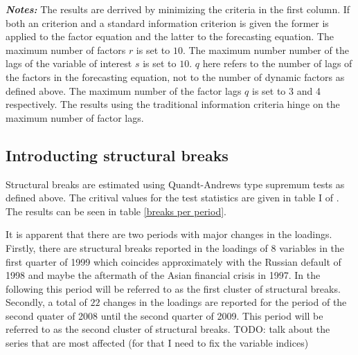 \documentclass[12pt]{article}
\begin{document}
\begin{table}[ht]
	\begin{minipage}{15cm}
		\small{\textbf{\textit{Notes:}} The results are derrived by minimizing the criteria in the first column. If both an \citet{bai2002determining} criterion and a standard information criterion is given the former is applied to the factor equation and the latter to the forecasting equation. The maximum number of factors $r$ is set to $10$. The maximum number number of the lags of the variable of interest $s$ is set to $10$. $q$ here refers to the number of lags of the factors in the forecasting equation, not to the number of dynamic factors as defined above. The maximum number of the factor lags $q$ is set to 3 and 4 respectively. The results using the traditional information criteria hinge on the maximum number of factor lags.}
	\end{minipage}
\end{table}

\subsection{Introducting structural breaks}
Structural breaks are estimated using Quandt-Andrews type supremum tests as defined above. The critival values for the test statistics are given in table I of \citet{andrews2003tests}. The results can be seen in table \ref{breaks per period}. 

It is apparent that there are two periods with major changes in the loadings. Firstly, there are structural breaks reported in the loadings of $8$ variables in the first quarter of 1999 which coincides approximately with the Russian default of 1998 and maybe the aftermath of the Asian financial crisis in 1997. In the following this period will be referred to as the first cluster of structural breaks. Secondly, a total of $22$ changes in the loadings are reported for the period of the second quater of 2008 until the second quarter of 2009. This period will be referred to as the second cluster of structural breaks.
TODO: talk about the series that are most affected (for that I need to fix the variable indices)
\\
\end{document}
